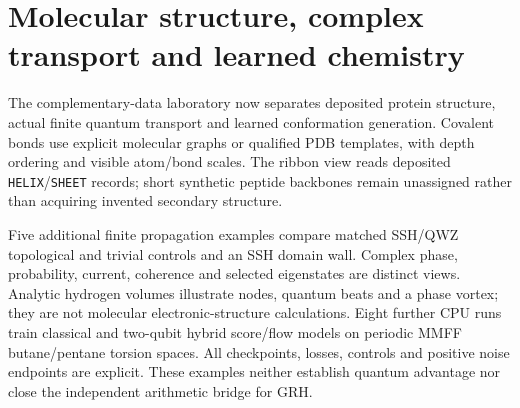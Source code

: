 \section{Molecular structure, complex transport and learned chemistry}
The complementary-data laboratory now separates deposited protein structure,
actual finite quantum transport and learned conformation generation. Covalent
bonds use explicit molecular graphs or qualified PDB templates, with depth
ordering and visible atom/bond scales. The ribbon view reads deposited
\texttt{HELIX}/\texttt{SHEET} records; short synthetic peptide backbones remain
unassigned rather than acquiring invented secondary structure.

Five additional finite propagation examples compare matched SSH/QWZ
topological and trivial controls and an SSH domain wall. Complex phase,
probability, current, coherence and selected eigenstates are distinct views.
Analytic hydrogen volumes illustrate nodes, quantum beats and a phase vortex;
they are not molecular electronic-structure calculations. Eight further CPU
runs train classical and two-qubit hybrid score/flow models on periodic MMFF
butane/pentane torsion spaces. All checkpoints, losses, controls and positive
noise endpoints are explicit. These examples neither establish quantum
advantage nor close the independent arithmetic bridge for GRH.
